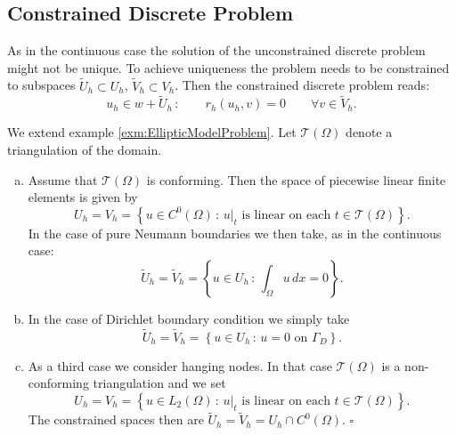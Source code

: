 \subsection{Constrained Discrete Problem}

As in the continuous case the solution of the unconstrained discrete
problem might not be unique. To achieve uniqueness the problem needs
to be constrained to subspaces $\tilde{U}_h \subset U_h$, $\tilde{V}_h
\subset V_h$. Then the constrained discrete problem reads:
\begin{equation}\label{eq:ConstrainedDiscreteProblem1}
u_h\in w+\tilde{U}_h \,: \qquad r_h(u_h,v) = 0 \qquad \forall v\in \tilde{V}_h .
\end{equation}

\begin{Exm}\label{exm:ConstrainedDiskreteSpaces}
We extend example \ref{exm:EllipticModelProblem}. Let $\mathcal{T}(\Omega)$
denote a triangulation of the domain.
\begin{enumerate}[a)]
\item Assume that $\mathcal{T}(\Omega)$ is conforming. Then the space
  of piecewise linear finite elements is given by
\begin{equation*}
U_h = V_h = \left\{ u\in C^0(\Omega) \,:\, \text{$u|_t$ is linear on each
  $t\in\mathcal{T}(\Omega)$} \right\} .
\end{equation*}
In the case of pure Neumann boundaries we then take, as in the
continuous case:
\begin{equation*}
\tilde{U}_h = \tilde{V}_h = \left\{ u\in U_h \,:\, 
\int_{\Omega} u \,dx = 0\right\} .
\end{equation*}
\item In the case of Dirichlet boundary condition we simply take
\begin{equation*}
\tilde{U}_h = \tilde{V}_h = \left\{ u\in U_h \,:\, 
\text{$u = 0$ on $\Gamma_D$} \right\} .
\end{equation*}
\item As a third case we consider hanging nodes. In that case
  $\mathcal{T}(\Omega)$ is a non-conforming triangulation and we set
\begin{equation*}
U_h = V_h = \left\{ u\in L_2(\Omega) \,:\, \text{$u|_t$ is linear on each
  $t\in\mathcal{T}(\Omega)$} \right\} .
\end{equation*}
The constrained spaces then are $\tilde{U}_h = \tilde{V}_h = U_h \cap
C^0(\Omega)$. \hfill$\square$
\end{enumerate}
\end{Exm} 


